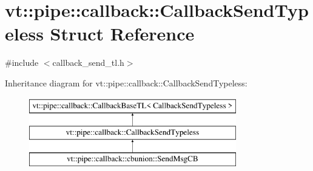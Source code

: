 \hypertarget{structvt_1_1pipe_1_1callback_1_1_callback_send_typeless}{}\section{vt\+:\+:pipe\+:\+:callback\+:\+:Callback\+Send\+Typeless Struct Reference}
\label{structvt_1_1pipe_1_1callback_1_1_callback_send_typeless}


{\ttfamily \#include $<$callback\+\_\+send\+\_\+tl.\+h$>$}

Inheritance diagram for vt\+:\+:pipe\+:\+:callback\+:\+:Callback\+Send\+Typeless\+:\begin{figure}[H]
\begin{center}
\leavevmode
\includegraphics[height=3.000000cm]{structvt_1_1pipe_1_1callback_1_1_callback_send_typeless}
\end{center}
\end{figure}
